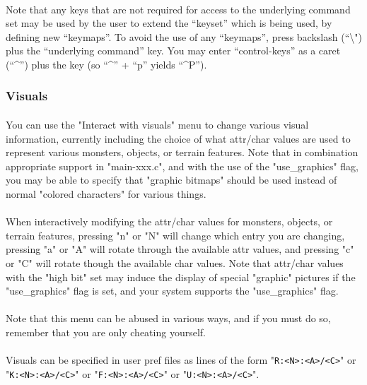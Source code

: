 \paragraph{}
Note that any keys that are not required for access to the underlying
command set may be used by the user to extend the ``keyset'' which is
being used, by defining new ``keymaps''.  To avoid the use of any
``keymaps'', press backslash (``\textbackslash ") plus the ``underlying
command'' key.  You may enter ``control-keys'' as a caret (``\^{}'') plus
the key (so ``\^{}'' + ``p'' yields ``\^{}P'').

\subsubsection{Visuals}
\paragraph{}You can use the "Interact with visuals" menu to change
various visual information, currently including the choice of what
attr/char values are used to represent various monsters, objects, or
terrain features. Note that in combination appropriate support in
"main-xxx.c", and with the use of the "use\_graphics" flag, you may be
able to specify that "graphic bitmaps" should be used instead of normal
"colored characters" for various things.

\paragraph{}When interactively modifying the attr/char values for
monsters, objects, or terrain features, pressing "n" or "N" will change
which entry you are changing, pressing "a" or "A" will rotate through
the available attr values, and pressing "c" or "C" will rotate though
the available char values. Note that attr/char values with the "high
bit" set may induce the display of special "graphic" pictures if the
"use\_graphics" flag is set, and your system supports the
"use\_graphics" flag.

\paragraph{}Note that this menu can be abused in various ways, and if
you must do so, remember that you are only cheating yourself.

\paragraph{}Visuals can be specified in user pref files as lines of the
form "\verb+R:<N>:<A>/<C>+" or "\verb+K:<N>:<A>/<C>+" or
"\verb+F:<N>:<A>/<C>+" or "\verb+U:<N>:<A>/<C>+".

